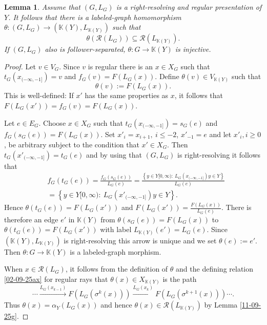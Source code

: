 \documentclass[12pt,oneside,english]{amsart}
\newtheorem{lemma}[thm]{Lemma}
\begin{document}
\begin{lemma}\label{02-09-25dx} Assume that $(G,L_G)$ is a right-resolving and regular presentation of $Y$. It follows that there is a labeled-graph homomorphism $\theta : (G,L_G) \to (\mathbb K(Y), L_{\mathbb K(Y)})$ such that
$$
\theta\left(\mathcal R(L_G)\right) \subseteq \mathcal R(L_{\mathbb K(Y)}).
$$
If $(G,L_G)$ also is follower-separated, $\theta : G \to \mathbb K(Y)$ is injective.
\end{lemma}
\begin{proof} Let $v \in V_G$. Since $v$ is regular there is an $x \in X_G$ such that $t_G(x_{(-\infty,-1]}) = v$ and 
$f_G(v)  = F(L_G(x))$.
Define $\theta(v) \in V_{\mathbb K(Y)}$ such that 
$$
\theta(v) := F(L_G(x)) .
$$
This is well-defined: If $x'$ has the same properties as $x$, it follows that
$F(L_G(x')) = f_G(v) = F(L_G(x))$.


Let $e \in E_G$. Choose $x \in X_G$ such that $t_G(x_{(-\infty,-1]}) = s_G(e)$ and 
$f_G(s_G(e)) = F(L_G(x))$.
Set $x'_i = x_{i+1}, \ i \leq -2$, $x'_{-1} =e$ and let $x'_i, i \geq 0$, be arbitrary subject to the condition that $x' \in X_G$. Then $t_G(x'_{(-\infty, -1]}) = t_G(e)$ and by using that $(G,L_G)$ is right-resolving it follows that
\begin{align*}
& f_G(t_G(e)) = \frac{f_G(s_G(e))}{L_G(e)}
 = \frac{\left\{y \in Y[0,\infty): \ L_G(x_{(-\infty,-1]})y \in Y \right\}}{L_G(e)} \\
 &= \left\{y \in Y[0,\infty): \ L_G(x'_{(-\infty,-1]})y \in Y \right\}.
\end{align*}
Hence $\theta(t_G(e)) = F(L_G(x'))$ and  $F(L_G(x')) = \frac{F(L_G(x))}{L_G(e)}$. There is therefore an edge $e'$ in $\mathbb K(Y)$ from $\theta(s_G(e)) =F(L_G(x)) $ to $\theta(t_G(e)) = F(L_G(x'))$ with label $L_{\mathbb K(Y)}(e') =L_G(e)$. Since $(\mathbb K(Y), L_{\mathbb K(Y)})$ is right-resolving this arrow is unique and we set $\theta(e):= e'$. Then $\theta : G \to \mathbb K(Y)$ is a labeled-graph morphism.

When $x \in \mathcal R(L_G)$, it follows from the definition of $\theta$ and the defining relation \eqref{02-09-25ax} for regular rays that $\theta(x) \in X_{\mathbb K(Y)}$ is the path
$$
\cdots  \overset{L_G(x_{k-1})}{\to}F(L_G(\sigma^k(x))) \overset{L_G(x_k)}{\to} F(L_G(\sigma^{k+1}(x))) \cdots .
$$ 
Thus $\theta(x) = \alpha_Y(L_G(x))$ and hence $\theta(x) \in \mathcal R(L_{\mathbb K(Y)})$ by Lemma \ref{11-09-25g}. 







\end{proof}
\end{document}
